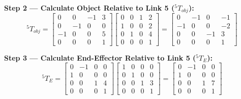 \documentclass[12pt,a3paper]{article}
\begin{document}
\begin{enumerate}
\begin{tcolorbox}[enhanced,breakable,ansbox,colback=cB!4,colframe=cB,
  boxrule=0.8pt,arc=5pt,
  title={\textbf{Answer}},fonttitle=\bfseries\color{white},
  colbacktitle=cB]
\medskip
\textbf{Step 2 — Calculate Object Relative to Link 5 (${}^5T_{obj}$):}
\[
  {}^5T_{obj} = 
  \begin{bmatrix}
    0 & 0 & -1 & 3 \\
    0 & -1 & 0 & 0 \\
    -1 & 0 & 0 & 5 \\
    0 & 0 & 0 & 1
  \end{bmatrix}
  \begin{bmatrix}
    0 & 0 & 1 & 2 \\
    1 & 0 & 0 & 2 \\
    0 & 1 & 0 & 4 \\
    0 & 0 & 0 & 1
  \end{bmatrix}
  =
  \begin{bmatrix}
    0 & -1 & 0 & -1 \\
    -1 & 0 & 0 & -2 \\
    0 & 0 & -1 & 3 \\
    0 & 0 & 0 & 1
  \end{bmatrix}
\]

\medskip
\textbf{Step 3 — Calculate End-Effector Relative to Link 5 (${}^5T_E$):}
\[
  {}^5T_E = 
  \begin{bmatrix}
    0 & -1 & 0 & 0 \\
    1 & 0 & 0 & 0 \\
    0 & 0 & 1 & 4 \\
    0 & 0 & 0 & 1
  \end{bmatrix}
  \begin{bmatrix}
    1 & 0 & 0 & 0 \\
    0 & 1 & 0 & 0 \\
    0 & 0 & 1 & 3 \\
    0 & 0 & 0 & 1
  \end{bmatrix}
  =
  \begin{bmatrix}
    0 & -1 & 0 & 0 \\
    1 & 0 & 0 & 0 \\
    0 & 0 & 1 & 7 \\
    0 & 0 & 0 & 1
  \end{bmatrix}
\]


\end{tcolorbox}
\end{enumerate}
\end{document}
